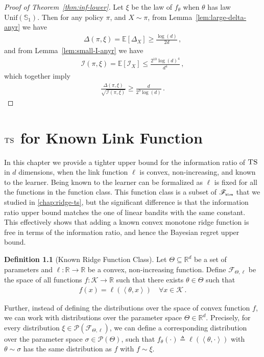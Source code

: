 \documentclass[letter, 12pt]{report}
\newcommand{\pr}{\text{\tiny\texttt{r}}}
\newcommand{\pb}{\text{\tiny\texttt{b}}}
\newcommand{\pl}{\text{\tiny\texttt{l}}}
\renewcommand{\pm}{\text{\tiny\texttt{m}}}
\newcommand{\R}{\mathbb R}
\newcommand{\ip}[1]{\left \langle #1 \right \rangle}
\newcommand{\sphere}{\mathbb{S}}
\newcommand{\brak}[1]{\left[ #1 \right]}
\newcommand{\E}{\mathbb E}
\newcommand{\cK}{\mathcal K}
\newcommand{\sF}{\mathscr F}
\newcommand{\sP}{\mathscr P}
\newcommand{\I}{\mathcal{I}}
\newcommand{\1}{\mathbf{1}}
\newcommand{\ts}{\textsc{TS}\xspace}
\theoremstyle{plain}
\theoremstyle{definition}
\newtheorem{definition}[theorem]{Definition}
\theoremstyle{remark}
\begin{document}
\begin{proof}[Proof of Theorem~\ref{thm:inf-lower}]
    Let $\xi$ be the law of $f_\theta$ when $\theta$ has law $\text{Unif}(\sphere_1)$.
    Then for any policy $\pi$, and $X \sim \pi$,
    from Lemma~\ref{lem:large-delta-anyr} we have
    \begin{align*}
        \Delta(\pi, \xi)
        =
        \E\brak{\Delta_X}
        \geq    \frac{\log(d)}{2d}\,,
    \end{align*}
    and from Lemma~\ref{lem:small-I-anyr} we have
    \begin{align*}
        \I(\pi, \xi) = \E[\I_X] \leq \frac{2^{10}\log(d)^4}{d^4} \,,
    \end{align*}
    which together imply
    \begin{align*}
        \frac{\Delta(\pi, \xi)}{\sqrt{\I(\pi, \xi)}}
        \geq \frac{d}{2^{9}\log(d)}\,.
    \end{align*}
\end{proof}

\chapter{$\ts$ for Known Link Function}
In this chapter we provide a tighter upper bound for the
information ratio of $\ts$ in $d$ dimensions, when the link function $\ell$ is convex, non-increasing, and known to the learner.
Being known to the learner can be formalized as $\ell$ is fixed for all the functions in the function class.
This function class is a subset of $\sF_{\pb\pl\pr\pm}$ that we studied in \cref{chap:ridge-ts}, but the significant difference is that the information ratio upper bound matches the one of linear bandits \citep{RV16} with the same constant.
This effectively shows that adding a known convex monotone ridge function is free in terms of the information ratio, and hence the Bayesian regret upper bound.

\begin{definition}[Known Ridge Function Class]
    Let $\Theta \subseteq \R^d$ be a set of parameters and $\ell:\R\to\R$ be a convex, non-increasing function.
    Define $\sF_{\Theta, \ell}$ be the space of all functions $f:\cK \to \R$ such that
    there exists $\theta \in \Theta$ such that
    \begin{align*}
        f(x) =\ell(\ip{\theta, x})\quad \forall x \in \cK\,.
    \end{align*}
\end{definition}

Further, instead of defining the distributions over the space of convex function $f$, we can work with distributions over the parameter space $\Theta \in \R^d$.
Precisely, for every distribution $\xi \in \sP(\sF_{\Theta, \ell})$, we can define a corresponding distribution over the parameter space $\sigma \in \sP(\Theta)$,
such that $f_\theta(\cdot) \triangleq \ell(\ip{\theta, \cdot})$ with $\theta \sim \sigma$ has the same distribution as $f$ with $f \sim \xi$.
\end{document}
